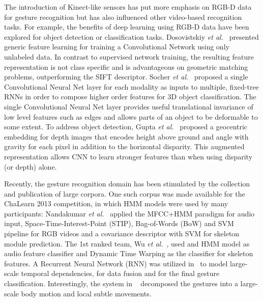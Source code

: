 The introduction of  Kinect-like sensors has put more emphasis on RGB-D data for gesture recognition but has also influenced other video-based recognition tasks.
For example, the benefits of deep learning using RGB-D data have been explored for object detection or classification tasks.
%
Dosovistskiy \emph{et al.}~\cite{DosovitskiySRB14} presented generic feature learning for training a Convolutional Network using only unlabeled data. In contrast to supervised network training, the resulting feature representation is not class specific and is advantageous on geometric matching problems, outperforming the SIFT descriptor.
Socher \emph{et al.}~\cite{socher2012convolutional} proposed a single Convolutional Neural Net layer for each modality as inputs to multiple, fixed-tree RNNs in order to compose higher order features for 3D object classification. The single Convolutional Neural Net layer provides useful translational invariance of low level features such as edges and allows parts of an object to be deformable to some extent.
To address object detection, Gupta \emph{et al.}~\cite{gupta2014learning} proposed a geocentric embedding for depth images that encodes height above ground and angle with gravity for each pixel in addition to the horizontal disparity.
This augmented representation allows CNN to learn stronger features than when using disparity (or depth) alone.

Recently, the gesture recognition domain has been stimulated by the collection and publication of large corpora.
One such corpus was made available for the ChaLearn 2013 competition, in which HMM models were used by many participants:
Nandakumar \emph{et al.}~\cite{nandakumar2013multi} applied the MFCC+HMM paradigm for audio input, Space-Time-Interest-Point (STIP), Bag-of-Words (BoW) and SVM pipeline for RGB videos and a covariance descriptor with SVM for skeleton module prediction. The 1st ranked team, Wu \emph{et al.}~\cite{wu2013fusing}, used and HMM model as audio feature classifier and Dynamic Time Warping as the classifier for skeleton features.  A Recurrent Neural Network (RNN) was utilized in~\cite{neverova2013multi} to model large-scale temporal dependencies, for data fusion and for the final gesture classification.  Interestingly, the system in ~\cite{neverova2013multi} decomposed the gestures into a large-scale body motion and local subtle movements.

